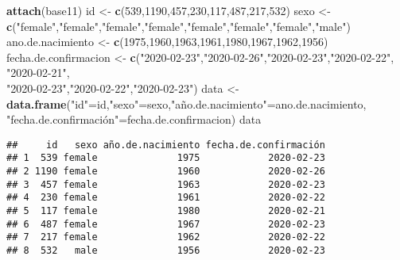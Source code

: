 \documentclass[]{article}
\newenvironment{Shaded}{\begin{snugshade}}{\end{snugshade}}
\newcommand{\KeywordTok}[1]{\textcolor[rgb]{0.13,0.29,0.53}{\textbf{#1}}}
\newcommand{\DecValTok}[1]{\textcolor[rgb]{0.00,0.00,0.81}{#1}}
\newcommand{\StringTok}[1]{\textcolor[rgb]{0.31,0.60,0.02}{#1}}
\newcommand{\NormalTok}[1]{#1}
\begin{document}
\begin{Shaded}
\begin{Highlighting}[]
\KeywordTok{attach}\NormalTok{(base11)}
\NormalTok{id <-}\StringTok{ }\KeywordTok{c}\NormalTok{(}\DecValTok{539}\NormalTok{,}\DecValTok{1190}\NormalTok{,}\DecValTok{457}\NormalTok{,}\DecValTok{230}\NormalTok{,}\DecValTok{117}\NormalTok{,}\DecValTok{487}\NormalTok{,}\DecValTok{217}\NormalTok{,}\DecValTok{532}\NormalTok{)}
\NormalTok{sexo <-}\KeywordTok{c}\NormalTok{(}\StringTok{"female"}\NormalTok{,}\StringTok{"female"}\NormalTok{,}\StringTok{"female"}\NormalTok{,}\StringTok{"female"}\NormalTok{,}\StringTok{"female"}\NormalTok{,}\StringTok{"female"}\NormalTok{,}\StringTok{"female"}\NormalTok{,}\StringTok{"male"}\NormalTok{)}
\NormalTok{ano.de.nacimiento <-}\StringTok{ }\KeywordTok{c}\NormalTok{(}\DecValTok{1975}\NormalTok{,}\DecValTok{1960}\NormalTok{,}\DecValTok{1963}\NormalTok{,}\DecValTok{1961}\NormalTok{,}\DecValTok{1980}\NormalTok{,}\DecValTok{1967}\NormalTok{,}\DecValTok{1962}\NormalTok{,}\DecValTok{1956}\NormalTok{)}
\NormalTok{fecha.de.confirmacion <-}\StringTok{ }\KeywordTok{c}\NormalTok{(}\StringTok{"2020-02-23"}\NormalTok{,}\StringTok{"2020-02-26"}\NormalTok{,}\StringTok{"2020-02-23"}\NormalTok{,}\StringTok{"2020-02-22"}\NormalTok{, }\StringTok{"2020-02-21"}\NormalTok{,}\\
\StringTok{"2020-02-23"}\NormalTok{,}\StringTok{"2020-02-22"}\NormalTok{,}\StringTok{"2020-02-23"}\NormalTok{)}
\NormalTok{data <-}\StringTok{ }\KeywordTok{data.frame}\NormalTok{(}\StringTok{"id"}\NormalTok{=id,}\StringTok{"sexo"}\NormalTok{=sexo,}\StringTok{"año.de.nacimiento"}\NormalTok{=ano.de.nacimiento,}\\

\StringTok{"fecha.de.confirmación"=fecha.de.confirmacion)}
\StringTok{data}
\end{Highlighting}
\end{Shaded}

\begin{verbatim}
##     id   sexo año.de.nacimiento fecha.de.confirmación
## 1  539 female              1975            2020-02-23
## 2 1190 female              1960            2020-02-26
## 3  457 female              1963            2020-02-23
## 4  230 female              1961            2020-02-22
## 5  117 female              1980            2020-02-21
## 6  487 female              1967            2020-02-23
## 7  217 female              1962            2020-02-22
## 8  532   male              1956            2020-02-23
\end{verbatim}
\end{document}
